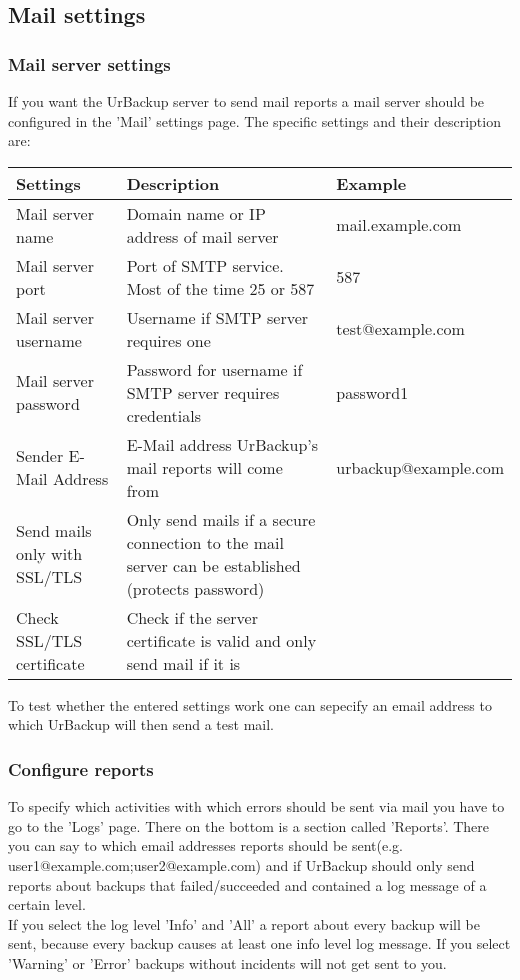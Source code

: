 \documentclass[a4paper,10pt]{article}
\begin{document}
\subsection{Mail settings}

\subsubsection{Mail server settings}

If you want the UrBackup server to send mail reports a mail server should be configured in the 'Mail' settings page. The specific settings and their description are:

\begin{longtable}{|p{}|p{}|p{}|}
\hline
Settings  & Description & Example\\
\hline\hline
Mail server name & Domain name or IP address of mail server & mail.example.com \\
\hline
Mail server port & Port of SMTP service. Most of the time 25 or 587 & 587 \\
\hline
Mail server username & Username if SMTP server requires one & test@example.com \\
\hline
Mail server password & Password for username if SMTP server requires credentials & password1 \\
\hline
Sender E-Mail Address & E-Mail address UrBackup's mail reports will come from & urbackup@example.com \\
\hline
Send mails only with SSL/TLS & Only send mails if a secure connection to the mail server can be established (protects password) & \\
\hline
Check SSL/TLS certificate & Check if the server certificate is valid and only send mail if it is & \\
\hline
\end{longtable}

To test whether the entered settings work one can sepecify an email address to which UrBackup will then send a test mail.

\subsubsection{Configure reports}

To specify which activities with which errors should be sent via mail you have to go to the 'Logs' page. There on the bottom is a section called 'Reports'.
There you can say to which email addresses reports should be sent(e.g. user1@example.com;user2@example.com) and if UrBackup should only send reports about backups that
failed/succeeded and contained a log message of a certain level.\\
If you select the log level 'Info' and 'All' a report about every backup will be sent, because every backup causes at least one info level log message. If you select 'Warning' or 'Error' backups without incidents will not get sent to you.
\end{document}
